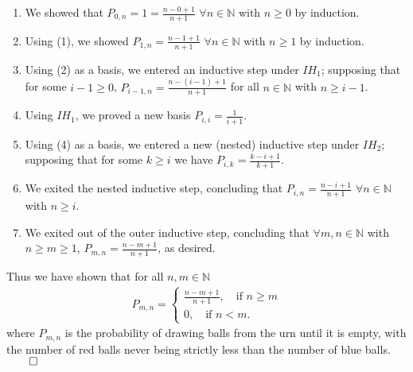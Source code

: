 \documentclass[11pt, letterpaper]{article}
\newcommand{\mbb}[1]{\mathbb{#1}}
\begin{document}
    \begin{enumerate}
        \item We showed that $P_{0,n}=1=\frac{n-0+1}{n+1}$ $\forall n\in\mbb{N}$ with $n\geq 0$ by induction.
        \item Using (1), we showed $P_{1,n}=\frac{n-1+1}{n+1}$ $\forall n\in\mbb{N}$ with $n\geq 1$ by induction.
        \item Using (2) as a basis, we entered an inductive step under $IH_1$; supposing that for some $i-1\geq 0$, $P_{i-1,n}=\frac{n-(i-1)+1}{n+1}$ for all $n\in\mbb{N}$ with $n\geq i-1$.
        \item Using $IH_1$, we proved a new basis $P_{i,i}=\frac{1}{i+1}$.
        \item Using (4) as a basis, we entered a new (nested) inductive step under $IH_2$; supposing that for some $k\geq i$ we have $P_{i,k}=\frac{k-i+1}{k+1}$.
        \item We exited the nested inductive step, concluding that $P_{i,n}=\frac{n-i+1}{n+1}$ $\forall n\in\mbb{N}$ with $n\geq i$.
        \item We exited out of the outer inductive step, concluding that $\forall m,n\in\mbb{N}$ with $n\geq m\geq 1$, $P_{m,n}=\frac{n-m+1}{n+1}$, as desired.
    \end{enumerate}
    Thus we have shown that for all $n,m\in\mbb{N}$
    \begin{align*}
        P_{m,n}=\begin{cases}
            \frac{n-m+1}{n+1},\quad\text{if $n\geq m$}\\
            0,\quad\text{if $n<m$.}
        \end{cases}
    \end{align*}
    where $P_{m,n}$ is the probability of drawing balls from the urn until it is empty, with the number of red balls never being strictly less than the number of blue balls.\hfill{$\qed$}\\[10pt]
\end{document}
